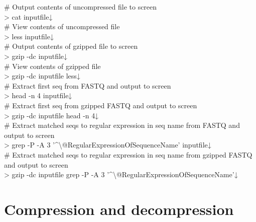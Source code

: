 \documentclass[titlepage,10pt,a4paper,english]{jsbook}
\newenvironment{cmd}{\begin{oframed}\raggedright\ttfamily\footnotesize\setlength{\baselineskip}{1.4em}}{\end{oframed}\vspace{-1em}}
\begin{document}
\begin{cmd}
\# Output contents of uncompressed file to screen\\
{\textgreater} cat inputfile↓\\
\# View contents of uncompressed file\\
{\textgreater} less inputfile↓\\
\# Output contents of gzipped file to screen\\
{\textgreater} gzip -dc inputfile↓\\
\# View contents of gzipped file\\
{\textgreater} gzip -dc inputfile {\textbar} less↓\\
\# Extract first seq from FASTQ and output to screen\\
{\textgreater} head -n 4 inputfile↓\\
\# Extract first seq from gzipped FASTQ and output to screen\\
{\textgreater} gzip -dc inputfile {\textbar} head -n 4↓\\
\# Extract matched seqs to regular expression in seq name from FASTQ and output to screen\\
{\textgreater} grep -P -A 3 '{\textasciicircum}{\textbackslash}@RegularExpressionOfSequenceName' inputfile↓\\
\# Extract matched seqs to regular expression in seq name from gzipped FASTQ and output to screen\\
{\textgreater} gzip -dc inputfile {\textbar} grep -P -A 3 '{\textasciicircum}{\textbackslash}@RegularExpressionOfSequenceName'↓
\end{cmd}

\section{Compression and decompression}
\end{document}
